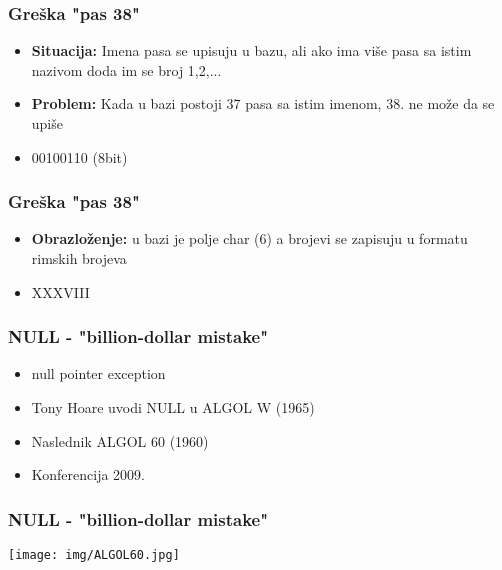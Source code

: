 \documentclass{beamer}
\begin{document}
\begin{frame}
    \frametitle{Greška "pas 38"}
    \begin{itemize}
        \item \textbf{Situacija: } Imena pasa se upisuju u bazu, ali ako ima više pasa sa istim nazivom doda im se broj 1,2,... \newline
        \item \textbf{Problem: } Kada u bazi postoji 37 pasa sa istim imenom, 38. ne može da se upiše \newline
        \item 00100110 (8bit)
    \end{itemize}
\end{frame}

\begin{frame}
    \frametitle{Greška "pas 38"}
    \begin{itemize}
        \item \textbf{Obrazloženje:} u bazi je polje char (6) a brojevi se zapisuju u formatu rimskih brojeva \newline
        \item XXXVIII
    \end{itemize}

    

\end{frame}

\begin{frame}
    \frametitle{NULL - "billion-dollar mistake"}
    \begin{itemize}
        \item null pointer exception \newline
        \item Tony Hoare uvodi NULL u ALGOL W (1965)\newline
        \item Naslednik ALGOL 60 (1960) \newline
        \item Konferencija 2009.
    \end{itemize}
\end{frame}
    
\begin{frame}
    \frametitle{NULL - "billion-dollar mistake"}
    \begin{center}
        \texttt{[image: img/ALGOL60.jpg]}    
    \end{center}
\end{frame}
\end{document}
